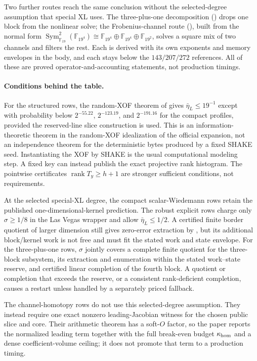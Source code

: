 \documentclass[11pt]{article}
\newcommand{\F}{\mathbb F}
\newcommand{\Sym}{\operatorname{Sym}}
\newcommand{\rank}{\operatorname{rank}}
\begin{document}
Two further routes reach the same conclusion without the selected-degree
assumption that special XL uses.  The three-plus-one decomposition
() drops one block from the nonlinear solve; the
Frobenius-channel route (), built from the normal
form
$\Sym^2_{\F_{19}}(\F_{19^4})\cong\F_{19^4}\oplus\F_{19^4}\oplus\F_{19^2}$,
solves a square mix of two channels and filters the rest.  Each is derived with
its own exponents and memory envelopes in the body, and each stays below the
$143/207/272$ references.  All of these are proved operator-and-accounting
statements, not production timings.

\paragraph{Conditions behind the table.}
For the structured rows, the random-XOF theorem of
 gives $\bar\eta_L\le19^{-1}$ except with probability
below $2^{-55.22}$, $2^{-123.19}$, and $2^{-191.16}$ for the compact profiles,
provided the reserved-line slice construction is used.  This is an
information-theoretic theorem in the random-XOF idealization of the official
expansion, not an independence theorem for the deterministic bytes produced by
a fixed SHAKE seed.  Instantiating the XOF by SHAKE is the usual computational
modeling step.  A fixed key can instead publish the exact projective rank
histogram.  The pointwise certificates $\rank T_y\ge h+1$ are stronger
sufficient conditions, not requirements.

At the selected special-XL degree, the compact scalar-Wiedemann rows retain the
published one-dimensional-kernel prediction.  The robust explicit rows charge
only $\sigma\ge1/8$ in the Las Vegas wrapper and allow
$\bar\eta_L\le1/2$.  A certified finite border quotient of larger dimension
still gives zero-error extraction by , but
its additional block/kernel work is not free and must fit the stated work and
state envelope.  For the three-plus-one rows, $\sigma$ jointly covers a complete finite
quotient for the three-block subsystem, its extraction and enumeration within
the stated work--state reserve, and certified linear completion of the fourth
block.  A quotient or completion that exceeds the reserve, or a consistent
rank-deficient completion, causes a restart unless handled by a separately
priced fallback.

The channel-homotopy rows do not use this selected-degree assumption.  They
instead require one exact nonzero leading-Jacobian witness for the chosen
public slice and core.  Their arithmetic theorem has a soft-$O$ factor, so the
paper reports the normalized leading term together with the full break-even
budget $\kappa_{\rm hom}$ and a dense coefficient-volume ceiling; it does
not promote that term to a production timing.
\end{document}
